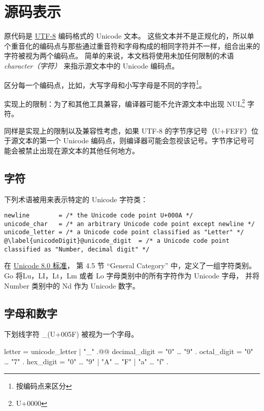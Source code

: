 
\chapter{源码表示}
原代码是 \href{http://en.wikipedia.org/wiki/UTF-8}{UTF-8} 编码格式的 Unicode 文本。
这些文本并不是正规化的，所以单个重音化的编码点与那些通过重音符和字母构成的相同字符并不一样，组合出来的字符被视为两个编码点。
简单的来说，本文档将使用未加任何限制的术语 \emph{character（字符）} 来指示源文本中的 Unicode 编码点。

区分每一个编码点，比如，大写字母和小写字母是不同的字符\footnote{按编码点来区分}。

实现上的限制：为了和其他工具兼容，编译器可能不允许源文本中出现 NUL\footnote{U+0000} 字符。

同样是实现上的限制以及兼容性考虑，如果 UTF-8 的字节序记号（U+FEFF）位于源文本的第一个 Unicode 编码点，则编译器可能会忽视该记号。字节序记号可能会被禁止出现在源文本的其他任何地方。

\section{字符}
下列术语被用来表示特定的 Unicode 字符类：
\begin{lstlisting}[style=EBNF]
newline        = /* the Unicode code point U+000A */
unicode_char   = /* an arbitrary Unicode code point except newline */
unicode_letter = /* a Unicode code point classified as "Letter" */
@\label{unicodeDigit}@unicode_digit  = /* a Unicode code point classified as "Number, decimal digit" */
\end{lstlisting}
在 \href{http://www.unicode.org/versions/Unicode8.0.0/}{Unicode 8.0 标准}，
第 4.5 节 ``General Category'' 中，定义了一组字符类别。
Go 将Lu，LI，Lt，Lm 或者 Lo 字母类别中的所有字符作为 Unicode 字母，
并将 Number 类别中的 Nd 作为 Unicode 数字。

\section{字母和数字}
下划线字符 \_(U+005F) 被视为一个字母。
\begin{EBNF}
letter        = unicode_letter | "_" .@\label{letter}@
decimal_digit = "0" … "9" .
octal_digit   = "0" … "7" .
hex_digit     = "0" … "9" | "A" … "F" | "a" … "f" .
\end{EBNF}



